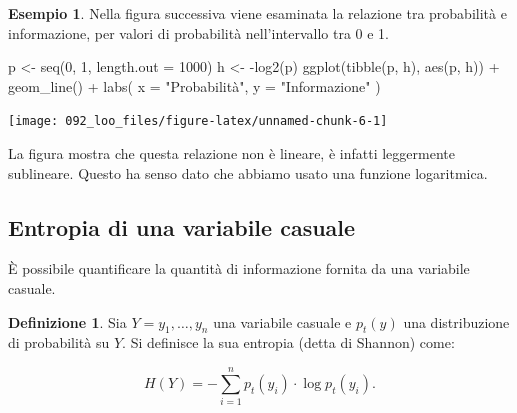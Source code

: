 \documentclass[
  10pt,
  italian,
  a4paper,
  extrafontsizes,onecolumn,openright
  ]{memoir}
\newenvironment{Shaded}{\begin{snugshade}}{\end{snugshade}}
\newcommand{\AttributeTok}[1]{\textcolor[rgb]{0.77,0.63,0.00}{#1}}
\newcommand{\DecValTok}[1]{\textcolor[rgb]{0.00,0.00,0.81}{#1}}
\newcommand{\FunctionTok}[1]{\textcolor[rgb]{0.00,0.00,0.00}{#1}}
\newcommand{\NormalTok}[1]{#1}
\newcommand{\OtherTok}[1]{\textcolor[rgb]{0.56,0.35,0.01}{#1}}
\newcommand{\SpecialCharTok}[1]{\textcolor[rgb]{0.00,0.00,0.00}{#1}}
\newcommand{\StringTok}[1]{\textcolor[rgb]{0.31,0.60,0.02}{#1}}
\theoremstyle{definition}
\newtheorem{definition}{Definizione}[chapter]
\theoremstyle{definition}
\newtheorem{example}{Esempio}[chapter]
\theoremstyle{definition}
\theoremstyle{definition}
\theoremstyle{remark}
\begin{document}
\begin{example}
Nella figura successiva viene esaminata la relazione tra probabilità e informazione, per valori di probabilità nell'intervallo tra 0 e 1.

\begin{Shaded}
\begin{Highlighting}[]
\NormalTok{p }\OtherTok{\textless{}{-}} \FunctionTok{seq}\NormalTok{(}\DecValTok{0}\NormalTok{, }\DecValTok{1}\NormalTok{, }\AttributeTok{length.out =} \DecValTok{1000}\NormalTok{)}
\NormalTok{h }\OtherTok{\textless{}{-}} \SpecialCharTok{{-}}\FunctionTok{log2}\NormalTok{(p)}
\FunctionTok{ggplot}\NormalTok{(}\FunctionTok{tibble}\NormalTok{(p, h), }\FunctionTok{aes}\NormalTok{(p, h)) }\SpecialCharTok{+}
  \FunctionTok{geom\_line}\NormalTok{() }\SpecialCharTok{+}
  \FunctionTok{labs}\NormalTok{(}
    \AttributeTok{x =} \StringTok{"Probabilità"}\NormalTok{,}
    \AttributeTok{y =} \StringTok{"Informazione"}
\NormalTok{  )}
\end{Highlighting}
\end{Shaded}

\begin{center}\texttt{[image: 092\_loo\_files/figure-latex/unnamed-chunk-6-1]} \end{center}

\noindent
La figura mostra che questa relazione non è lineare, è infatti leggermente sublineare. Questo ha senso dato che abbiamo usato una funzione logaritmica.
\end{example}

\hypertarget{entropia-di-una-variabile-casuale}{%
\subsection{Entropia di una variabile casuale}\label{entropia-di-una-variabile-casuale}}

È possibile quantificare la quantità di informazione fornita da una variabile casuale.

\begin{definition}
Sia \(Y = y_1, \dots, y_n\) una variabile casuale e \(p_t(y)\) una distribuzione di probabilità su \(Y\). Si definisce la sua entropia (detta di Shannon) come:

\begin{equation}
H(Y) = - \sum_{i=1}^n p_t(y_i) \cdot \log p_t(y_i).
\label{eq:entropy}
\end{equation}
\end{definition}
\end{document}
